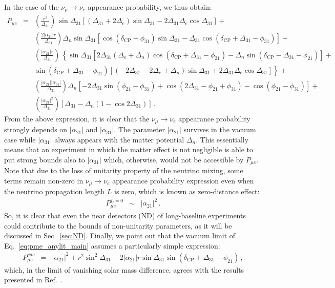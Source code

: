 \documentclass[11pt,a4paper]{article}
\newcommand{\ame}{\ensuremath{\alpha_{21}}}
\begin{document}
In the case of the $\nu_{\mu}\rightarrow\nu_{e}$ appearance probability, we thus obtain:
\begin{eqnarray}
P_{\mu e} &=& \left(\frac{r^2}{\Delta_{31}}\right)\, \sin \Delta_{31} \left[(\Delta_{31}+2 \Delta_{e}) \sin \Delta_{31}-2 \Delta_{31} \Delta_{e} \cos\Delta_{31}\right]\nonumber + \\
   && \left(\frac{2 |\alpha_{31}|  r}{\Delta_{31}}\right) \Delta_n \sin\Delta_{31} \left[\cos (\delta_{\mathrm{CP}}-\phi_{31}) \sin\Delta_{31}-\Delta_{31}
   \cos (\delta_{\mathrm{CP}}+\Delta_{31}-\phi_{31})\right] \nonumber + \\
&& \left(\frac{|\alpha_{21}| r}{\Delta_{31}} \right)  \,\left\{
\sin\Delta_{31}\left[2 \Delta_{31}   (\Delta_e+\Delta_n) \cos (\delta_{\mathrm{CP}}+\Delta_{31}  -\phi_{21})-\Delta_n \sin (\delta_{\mathrm{CP}}-\Delta_{31}  -\phi_{21})\right]+\right. \nonumber 
\\
&& \left.\sin (\delta_{\mathrm{CP}}+\Delta_{31}  -\phi_{21}) \left[(-2 \Delta_{31} -2 \Delta_e+\Delta_n) \sin\Delta_{31}+2 \Delta_{31}  \Delta_e  \cos\Delta_{31}\right]\right\}  + \nonumber\\
&& \left(\frac{|\alpha_{21}||\alpha_{31}|}{\Delta_{31} }\right) \Delta_n
\left[-2 \Delta_{31}  \sin (\phi_{21}-\phi_{31})+\cos (2 \Delta_{31} -\phi_{21}+\phi_{31})-\cos (\phi_{21}-\phi_{31})\right] \nonumber + \\ &&
   \left(\frac{|\alpha_{21}|^2}{\Delta_{31}}\right)\left[\Delta_{31}-\Delta_n (1-\cos 2  \Delta_{31})\right]\label{eq:pme_anylit_main}\,.
\end{eqnarray}
From the above expression, it is clear that the $\nu_{\mu}\rightarrow\nu_{e}$ appearance probability strongly depends on $|\alpha_{21}|$ and $|\alpha_{31}|$. 
 The parameter $|\ame|$ survives in the vacuum case while $|\alpha_{31}|$ always appears with the matter potential $\Delta_n$. This essentially means that an experiment in which the matter effect is not negligible is able to put strong bounds also to $|\alpha_{31}|$ which, otherwise, would not be accessible by $P_{\mu e}$. 
Note that due to the loss of unitarity property of the neutrino mixing, some terms remain non-zero in $\nu_{\mu}\rightarrow\nu_{e}$ appearance probability expression even when the neutrino propagation length $L$ is zero, which is known as zero-distance effect: 
\begin{eqnarray}
P_{\mu e}^{L = 0} &\sim& |\alpha_{21}|^2 \label{zerodistancemue}\,.
\end{eqnarray}
So, it is clear that even the near detectors (ND) of long-baseline experiments could contribute to the bounds of non-unitarity parameters, as it will be discussed in Sec.~\ref{sec:ND}. Finally, we point out that the vacuum limit of 
Eq.~\ref{eq:pme_anylit_main} assumes a particularly simple expression: 
\begin{eqnarray}
P_{\mu e}^{vac}&=&
|\alpha_{21}|^2+r^2 \sin ^2\Delta_{31}-2 |\alpha_{21}| r 
\sin\Delta_{31} \sin (\delta_{\mathrm{CP}}+\Delta_{31}-\phi_{21})
\label{pmuevacuum} \,,
\end{eqnarray}
which, in the limit of vanishing solar mass difference, agrees with the results presented in Ref.~\cite{Escrihuela:2015wra}.
\end{document}
